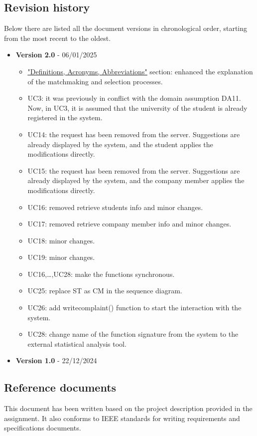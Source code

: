 \subsection{Revision history}
Below there are listed all the document versions in chronological order, starting from the most recent to the oldest.
\begin{itemize}
    \item \textbf{Version 2.0} - 06/01/2025
    \begin{itemize}
        \item \underline{\hyperref[sec:def]{"Definitions, Acronyms, Abbreviations"}} section: enhanced the explanation of the matchmaking and selection processes.
        \item UC3: it was previously in conflict with the domain assumption DA11. Now, in UC3, it is assumed that the university of the student is already registered in the system.
        \item UC14: the request has been removed from the server. Suggestions are already displayed by the system, and the student applies the modifications directly.
        \item UC15: the request has been removed from the server. Suggestions are already displayed by the system, and the company member applies the modifications directly.
        \item UC16: removed retrieve students info and minor changes.
        \item UC17: removed retrieve company member info and minor changes.
        \item UC18: minor changes.
        \item UC19: minor changes.
        \item UC16,\dots,UC28: make the functions synchronous.
        \item UC25: replace ST as CM in the sequence diagram.
        \item UC26: add writecomplaint() function to start the interaction with the system.
        \item UC28: change name of the function signature from the system to the external statistical analysis tool.
    \end{itemize}
    \item \textbf{Version 1.0} - 22/12/2024
\end{itemize}

\subsection{Reference documents}
This document has been written based on the project description provided in the assignment. It also conforms to IEEE standards for writing requirements and specifications documents.

